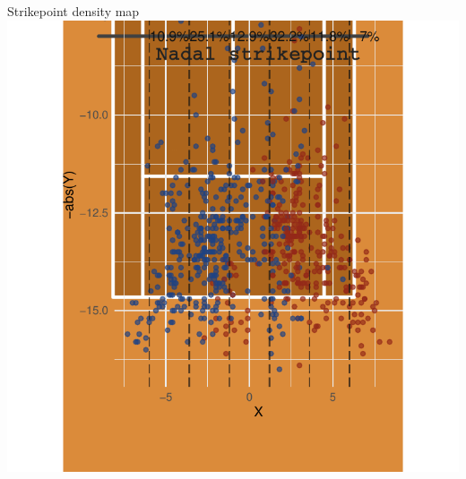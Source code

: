\documentclass[
  ignorenonframetext,
]{beamer}
\begin{document}
\begin{frame}{Strikepoint density map}
\protect\hypertarget{strikepoint-density-map}{}
\includegraphics{presentationtest1+_files/figure-beamer/strikepoint Nadal-1.pdf}
\end{frame}
\end{document}

